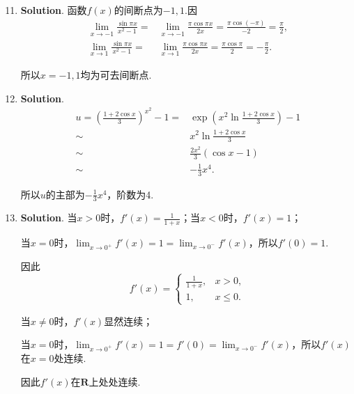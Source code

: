 \documentclass[../Main.tex]{subfiles}
\begin{document}
\begin{enumerate}
    \setcounter{enumi}{10}
    \item \textbf{Solution}. 函数$f(x)$的间断点为$-1,1$.因
          \[
              \begin{aligned}
                  \lim_{x\to-1}\frac{\sin\pi x}{x^2-1}= & \lim_{x\to-1}\frac{\pi\cos\pi x}{2x}=\frac{\pi\cos(-\pi)}{-2}=\frac{\pi}{2}, \\
                  \lim_{x\to1}\frac{\sin\pi x}{x^2-1}=  & \lim_{x\to1}\frac{\pi\cos\pi x}{2x}=\frac{\pi\cos\pi}{2}=-\frac{\pi}{2}.
              \end{aligned}
          \]

          所以$x=-1,1$均为可去间断点.

    \item \textbf{Solution}.
          \[
              \begin{aligned}
                  u=\left(\frac{1+2\cos x}{3}\right)^{x^2}-1= & \exp\left({x^2\ln\frac{1+2\cos x}{3}}\right)-1 \\
                  \sim                                        & x^{2}\ln\frac{1+2\cos x}{3}                    \\
                  \sim                                        & \frac{2x^2}{3}\left(\cos x-1\right)            \\
                  \sim                                        & -\frac{1}{3}x^{4}.
              \end{aligned}
          \]

          所以$u$的主部为$-\frac{1}{3}x^{4}$，阶数为4.

    \item \textbf{Solution}. 当$x>0$时，$f'(x)=\frac{1}{1+x}$；当$x<0$时，$f
              '(x)=1$；

          当$x=0$时，$\lim_{x\to0^+}f'(x)=1=\lim_{x\to0^-}f'(x)$，所以$f'(0)=1$.

          因此
          \[
              f'(x)=
              \begin{cases}
                  \frac{1}{1+x}, & x>0,    \\
                  1,             & x\leq0.
              \end{cases}
          \]

          当$x\neq0$时，$f'(x)$显然连续；

          当$x=0$时，$\lim_{x\to0^+}f'(x)=1=f'(0)=\lim_{x\to0^-}f'(x)$，所以$f'(x)$在$x
              =0$处连续.

          因此$f'(x)$在$\mathbf{R}$上处处连续.


\end{enumerate}
\end{document}
